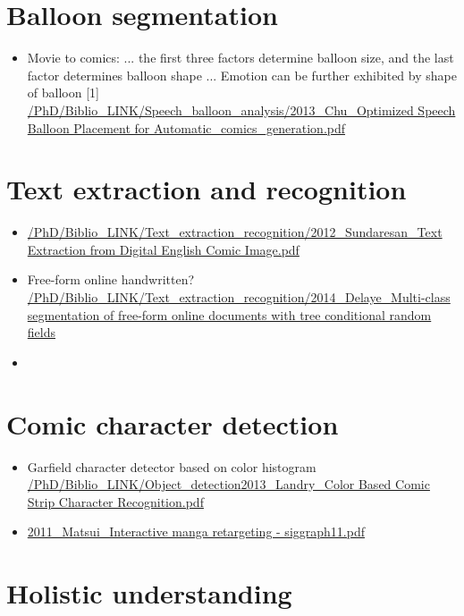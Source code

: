 \section{Balloon segmentation}
\label{sec:sota:balloon_segmentation}

\begin{itemize}
	\item Movie to comics: ... the first three factors determine balloon size, and the last factor determines balloon shape ... Emotion can be further exhibited by shape of balloon [1] \url{/PhD/Biblio_LINK/Speech_balloon_analysis/2013_Chu_Optimized Speech Balloon Placement for Automatic_comics_generation.pdf}


\end{itemize}

\section{Text extraction and recognition}
\label{sec:sota:text}

\begin{itemize}
	\item \url{/PhD/Biblio_LINK/Text_extraction_recognition/2012_Sundaresan_Text Extraction from Digital English Comic Image.pdf}
	\item Free-form online handwritten? \url{/PhD/Biblio_LINK/Text_extraction_recognition/2014_Delaye_Multi-class segmentation of free-form online documents with tree conditional random fields}
	\item 
\end{itemize}

\section{Comic character detection}
\label{sec:sota:comic_character}

\begin{itemize}
	\item Garfield character detector based on color histogram \url{/PhD/Biblio_LINK/Object_detection2013_Landry_Color Based Comic Strip Character Recognition.pdf}
	\item \url{2011_Matsui_Interactive manga retargeting - siggraph11.pdf}
\end{itemize}

\section{Holistic understanding} %
\label{sec:sota:holistic_understanding}

